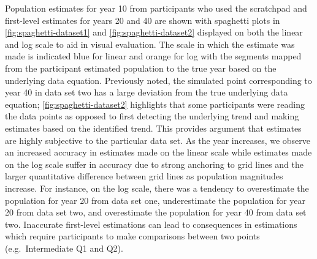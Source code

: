 \documentclass[print]{nuthesis}
\begin{document}
Population estimates for year 10 from participants who used the scratchpad and first-level estimates for years 20 and 40 are shown with spaghetti plots in \cref{fig:spaghetti-dataset1} and \cref{fig:spaghetti-dataset2} displayed on both the linear and log scale to aid in visual evaluation.
The scale in which the estimate was made is indicated blue for linear and orange for log with the segments mapped from the participant estimated population to the true year based on the underlying data equation.
Previously noted, the simulated point corresponding to year 40 in data set two has a large deviation from the true underlying data equation; \cref{fig:spaghetti-dataset2} highlights that some participants were reading the data points as opposed to first detecting the underlying trend and making estimates based on the identified trend.
This provides argument that estimates are highly subjective to the particular data set.
As the year increases, we observe an increased accuracy in estimates made on the linear scale while estimates made on the log scale suffer in accuracy due to strong anchoring to grid lines and the larger quantitative difference between grid lines as population magnitudes increase.
For instance, on the log scale, there was a tendency to overestimate the population for year 20 from data set one, underestimate the population for year 20 from data set two, and overestimate the population for year 40 from data set two.
Inaccurate first-level estimations can lead to consequences in estimations which require participants to make comparisons between two points (e.g.~Intermediate Q1 and Q2).
\end{document}
